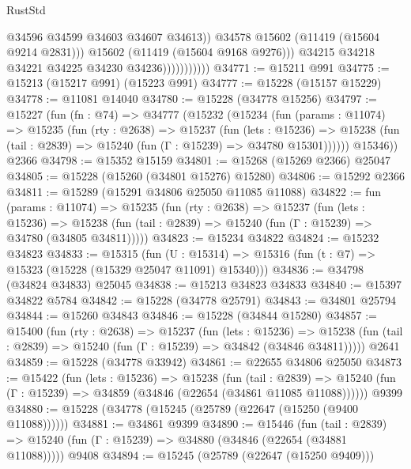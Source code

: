 \begin{lexlean}{RustStd}
\begin{coremodule}
                                  @34596
                                  @34599
                                  @34603
                                  @34607
                                  @34613))
                              @34578
                              @15602
                              (@11419 (@15604 @9214 @2831)))
                            @15602
                            (@11419 (@15604 @9168 @9276)))
                          @34215
                          @34218
                          @34221
                          @34225
                          @34230
                          @34236)))))))))))
@34771 := @15211 @991
@34775 := @15213 (@15217 @991) (@15223 @991)
@34777 := @15228 (@15157 @15229)
@34778 := @11081 @14040
@34780 := @15228 (@34778 @15256)
@34797 := @15227
    (fun (fn : @74) =>
    @34777
      (@15232
        (@15234
          (fun (params : @11074) =>
          @15235
            (fun (rty : @2638) =>
            @15237
              (fun (lets : @15236) =>
              @15238 (fun (tail : @2839) => @15240 (fun (Γ : @15239) => @34780 @15301))))))
        @15346))
    @2366
@34798 := @15352 @15159
@34801 := @15268 (@15269 @2366) @25047
@34805 := @15228 (@15260 (@34801 @15276) @15280)
@34806 := @15292 @2366
@34811 := @15289 (@15291 @34806 @25050 @11085 @11088)
@34822 := fun (params : @11074) =>
  @15235
    (fun (rty : @2638) =>
    @15237
      (fun (lets : @15236) =>
      @15238 (fun (tail : @2839) => @15240 (fun (Γ : @15239) => @34780 (@34805 @34811)))))
@34823 := @15234 @34822
@34824 := @15232 @34823
@34833 := @15315
    (fun (U : @15314) => @15316 (fun (t : @7) => @15323 (@15228 (@15329 @25047 @11091) @15340)))
@34836 := @34798 (@34824 @34833) @25045
@34838 := @15213 @34823 @34833
@34840 := @15397 @34822 @5784
@34842 := @15228 (@34778 @25791)
@34843 := @34801 @25794
@34844 := @15260 @34843
@34846 := @15228 (@34844 @15280)
@34857 := @15400
    (fun (rty : @2638) =>
    @15237
      (fun (lets : @15236) =>
      @15238 (fun (tail : @2839) => @15240 (fun (Γ : @15239) => @34842 (@34846 @34811)))))
    @2641
@34859 := @15228 (@34778 @33942)
@34861 := @22655 @34806 @25050
@34873 := @15422
    (fun (lets : @15236) =>
    @15238
      (fun (tail : @2839) =>
      @15240 (fun (Γ : @15239) => @34859 (@34846 (@22654 (@34861 @11085 @11088))))))
    @9399
@34880 := @15228 (@34778 (@15245 (@25789 (@22647 (@15250 (@9400 @11088))))))
@34881 := @34861 @9399
@34890 := @15446
    (fun (tail : @2839) => @15240 (fun (Γ : @15239) => @34880 (@34846 (@22654 (@34881 @11088)))))
    @9408
@34894 := @15245 (@25789 (@22647 (@15250 @9409)))

\end{coremodule}
\end{lexlean}
